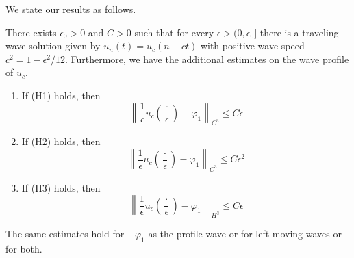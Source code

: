 We state our results as follows.
\begin{theorem}\label{thm:estimates-on-profile}
	There exists \(\epsilon_0> 0\) and \(C> 0\) such that for every \(\epsilon > (0,\epsilon_0]\) there is a traveling wave solution given by \(u_n(t) = u_c(n-ct)\) with positive wave speed \(c^2 = 1 - \epsilon^2/12\). Furthermore, we have the additional estimates on the wave profile of \(u_c\).
	\begin{enumerate}[label = (\roman*)]
		\item If (H1) holds, then
		\begin{equation*}
			\left\| \frac 1 \epsilon u_c\left(\frac \cdot \epsilon \right) - \varphi_1 \right\|_{C^3} \leq C \epsilon
		\end{equation*}
		\item If (H2) holds, then
		\begin{equation*}
			\left\| \frac 1 \epsilon u_c\left(\frac \cdot \epsilon \right) - \varphi_1 \right\|_{C^3} \leq C \epsilon^2
		\end{equation*}
		\item If (H3) holds, then
		\begin{equation*}
			\left\| \frac 1 \epsilon u_c\left(\frac \cdot \epsilon \right) - \varphi_1 \right\|_{H^3} \leq C \epsilon
		\end{equation*}
	\end{enumerate}
\end{theorem}
The same estimates hold for \(-\varphi_1\) as the profile wave or for left-moving waves or for both.